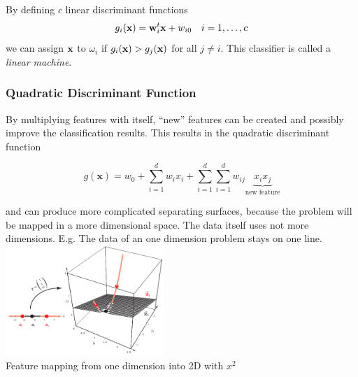     By defining $c$ linear discriminant functions
    \begin{equation*}
	    g_i(\mathbf{x}) = \mathbf{w}_i^t\mathbf{x} + w_{i0} \quad i=1,\ldots,c
    \end{equation*}
	we can assign $\mathbf{x}$ to $\omega_i$ if $g_i(\mathbf{x}) > g_j(\mathbf{x})$ for all $j \neq i$.
	This classifier is called a \emph{linear machine}.
      
  
  \label{sec:generalized_linear_discriminant_function}
  
  \begin{multicols}{2}
	  \subsubsection{Quadratic Discriminant Function}
	      By multiplying features with itself, ``new'' features can be created and possibly improve the classification
	      results. This results in the quadratic discriminant function
	      
	      \begin{equation*}
		      g(\bm x) = w_0 + \sum\limits_{i=1}^d w_i x_i + \sum\limits_{i=1}^d \sum\limits_{i=1}^d w_{ij} \underbrace{x_i x_j}_{\text{new feature}}
	      \end{equation*}
	      
	      and can produce more complicated separating surfaces, because the problem will be mapped in a more dimensional space.
	      The data itself uses not more dimensions. E.g. The data of an one dimension problem stays on one line. \\
	      
      	 \includegraphics[width=6cm]{./images/map1DTo2D.png} \\
       	 Feature mapping from one dimension into 2D with $x^2$ \\
       \columnbreak	 

\end{multicols}
